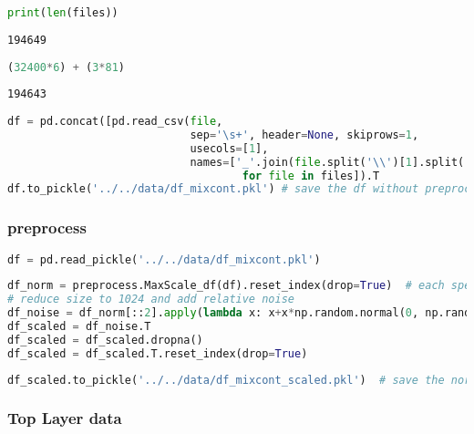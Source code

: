 \begin{lstlisting}[language=Python]
print(len(files))
\end{lstlisting}

\begin{lstlisting}
194649
\end{lstlisting}

\begin{lstlisting}[language=Python]
(32400*6) + (3*81)
\end{lstlisting}

\begin{lstlisting}
194643
\end{lstlisting}

\begin{lstlisting}[language=Python]
df = pd.concat([pd.read_csv(file,
                            sep='\s+', header=None, skiprows=1,
                            usecols=[1],
                            names=['_'.join(file.split('\\')[1].split('_')[:-1])]).T 
                                    for file in files]).T
df.to_pickle('../../data/df_mixcont.pkl') # save the df without preprocessing
\end{lstlisting}

\hypertarget{preprocess}{%
\subsubsection{preprocess}\label{preprocess}}

\begin{lstlisting}[language=Python]
df = pd.read_pickle('../../data/df_mixcont.pkl') 
\end{lstlisting}

\begin{lstlisting}[language=Python]
df_norm = preprocess.MaxScale_df(df).reset_index(drop=True)  # each spectrum is scaled to 1
# reduce size to 1024 and add relative noise
df_noise = df_norm[::2].apply(lambda x: x+x*np.random.normal(0, np.random.randint(1,3)*0.01 , len(x)))
df_scaled = df_noise.T
df_scaled = df_scaled.dropna()
df_scaled = df_scaled.T.reset_index(drop=True)
\end{lstlisting}

\begin{lstlisting}[language=Python]
df_scaled.to_pickle('../../data/df_mixcont_scaled.pkl')  # save the normalized, scaled df
\end{lstlisting}

\hypertarget{top-layer-data}{%
\subsubsection{Top Layer data}\label{top-layer-data}}

